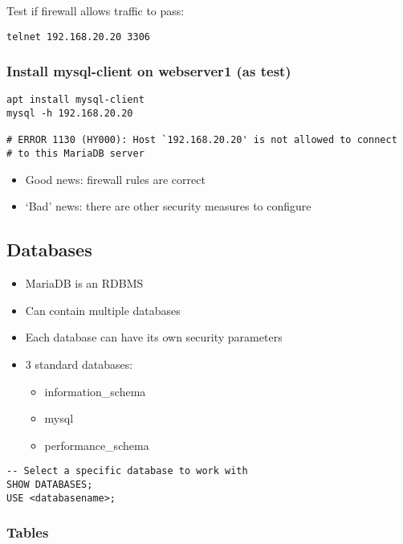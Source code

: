 \documentclass{article}
\begin{document}
Test if firewall allows traffic to pass:

\begin{verbatim}
telnet 192.168.20.20 3306
\end{verbatim}

\subsubsection{Install mysql-client on webserver1 (as test)}

\begin{verbatim}
apt install mysql-client
mysql -h 192.168.20.20

# ERROR 1130 (HY000): Host `192.168.20.20' is not allowed to connect 
# to this MariaDB server
\end{verbatim}

\begin{itemize}
    \item Good news: firewall rules are correct
    \item `Bad' news: there are other security measures to configure
\end{itemize}

\subsection{Databases}

\begin{itemize}
    \item MariaDB is an RDBMS
    \item Can contain multiple databases
    \item Each database can have its own security parameters
    \item 3 standard databases:
    \begin{itemize}
        \item information\_schema
        \item mysql
        \item performance\_schema
    \end{itemize}
\end{itemize}

\begin{verbatim}
-- Select a specific database to work with
SHOW DATABASES;
USE <databasename>;
\end{verbatim}

\subsubsection{Tables}
\end{document}
